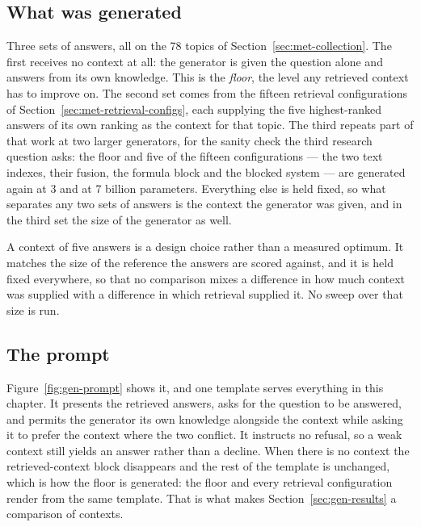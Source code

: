 \subsection*{What was generated}

Three sets of answers, all on the 78 topics of Section~\ref{sec:met-collection}. The first receives
no context at all: the generator is given the question alone and answers from its own knowledge.
This is the \emph{floor}, the level any retrieved context has to improve on. The second set comes
from the fifteen retrieval configurations of Section~\ref{sec:met-retrieval-configs}, each supplying
the five highest-ranked answers of its own ranking as the context for that topic. The third repeats
part of that work at two larger generators, for the sanity check the third research question asks:
the floor and five of the fifteen configurations --- the two text indexes, their fusion, the formula
block and the blocked system --- are generated again at 3 and at 7 billion parameters. Everything
else is held fixed, so what separates any two sets of answers is the context the generator was
given, and in the third set the size of the generator as well.

A context of five answers is a design choice rather than a measured optimum. It matches the size of
the reference the answers are scored against, and it is held fixed everywhere, so that no comparison
mixes a difference in how much context was supplied with a difference in which retrieval supplied
it. No sweep over that size is run.

\subsection*{The prompt}

Figure~\ref{fig:gen-prompt} shows it, and one template serves everything in this chapter. It
presents the retrieved answers, asks for the question to be answered, and permits the generator its
own knowledge alongside the context while asking it to prefer the context where the two conflict. It
instructs no refusal, so a weak context still yields an answer rather than a decline. When there is
no context the retrieved-context block disappears and the rest of the template is unchanged, which
is how the floor is generated: the floor and every retrieval configuration render from the same
template. That is what makes Section~\ref{sec:gen-results} a comparison of contexts.

